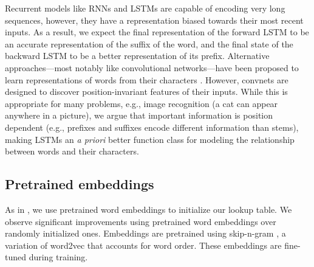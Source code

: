 \documentclass[11pt,letterpaper]{article}
\newcommand{\ignore}[1]{}
\begin{document}
Recurrent models like RNNs and LSTMs are capable of encoding very long sequences, however, they have a representation biased towards their most recent inputs. As a result, we expect the final representation of the forward LSTM to be an accurate representation of the suffix of the word, and the final state of the backward LSTM to be a better representation of its prefix. \ignore{Using a bidirectional LSTM to encode character representation of words, compared to a single LSTM, gives a small but significant improvement.}Alternative approaches---most notably like convolutional networks---have been proposed to learn representations of words from their characters \cite{zhang2015character,DBLP:journals/corr/KimJSR15}. However, convnets are designed to discover position-invariant features of their inputs. While this is appropriate for many problems, e.g., image recognition (a cat can appear anywhere in a picture), we argue that important information is position dependent (e.g., prefixes and suffixes encode different information than stems), making LSTMs an \emph{a priori} better function class for modeling the relationship between words and their characters.

\subsection{Pretrained embeddings}\label{sec:pretrained}
As in , we use pretrained word embeddings to initialize our lookup table. We observe significant improvements using pretrained word embeddings over randomly initialized ones. Embeddings are pretrained using skip-n-gram \cite{skipngram}, a variation of word2vec \cite{mikolov2013efficient} that accounts for word order. These embeddings are fine-tuned during training.
\end{document}
